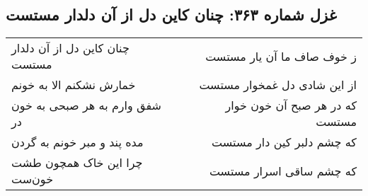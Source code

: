 \begin{center}
\section*{غزل شماره ۳۶۳: چنان کاین دل از آن دلدار مستست}
\label{sec:0363}
\begin{longtable}{l p{0.5cm} r}
چنان کاین دل از آن دلدار مستست
&&
ز خوف صاف ما آن یار مستست
\\
خمارش نشکنم الا به خونم
&&
از این شادی دل غمخوار مستست
\\
شفق وارم به هر صبحی به خون در
&&
که در هر صبح آن خون خوار مستست
\\
مده پند و مبر خونم به گردن
&&
که چشم دلبر کین دار مستست
\\
چرا این خاک همچون طشت خون‌ست
&&
که چشم ساقی اسرار مستست
\\
\end{longtable}
\end{center}

